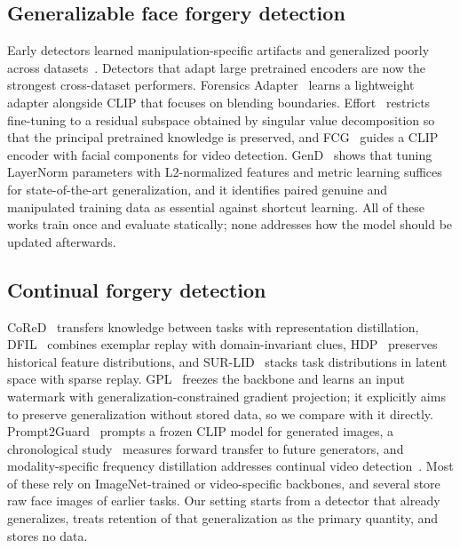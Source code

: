 \documentclass[journal]{IEEEtran}
\begin{document}
\subsection{Generalizable face forgery detection}
Early detectors learned manipulation-specific artifacts and generalized poorly across datasets~\cite{rossler2019faceforensics,yan2023deepfakebench}. Detectors that adapt large pretrained encoders are now the strongest cross-dataset performers. Forensics Adapter~\cite{cui2025forensicsadapter} learns a lightweight adapter alongside CLIP that focuses on blending boundaries. Effort~\cite{yan2025effort} restricts fine-tuning to a residual subspace obtained by singular value decomposition so that the principal pretrained knowledge is preserved, and FCG~\cite{han2025fcg} guides a CLIP encoder with facial components for video detection. GenD~\cite{yermakov2026gend} shows that tuning LayerNorm parameters with L2-normalized features and metric learning suffices for state-of-the-art generalization, and it identifies paired genuine and manipulated training data as essential against shortcut learning. All of these works train once and evaluate statically; none addresses how the model should be updated afterwards.

\subsection{Continual forgery detection}
CoReD~\cite{kim2021cored} transfers knowledge between tasks with representation distillation, DFIL~\cite{pan2023dfil} combines exemplar replay with domain-invariant clues, HDP~\cite{sun2023hdp} preserves historical feature distributions, and SUR-LID~\cite{cheng2025surlid} stacks task distributions in latent space with sparse replay. GPL~\cite{zhang2025gpl} freezes the backbone and learns an input watermark with generalization-constrained gradient projection; it explicitly aims to preserve generalization without stored data, so we compare with it directly. Prompt2Guard~\cite{laiti2024prompt2guard} prompts a frozen CLIP model for generated images, a chronological study~\cite{fontana2025chronological} measures forward transfer to future generators, and modality-specific frequency distillation addresses continual video detection~\cite{kim2026msfd}. Most of these rely on ImageNet-trained or video-specific backbones, and several store raw face images of earlier tasks. Our setting starts from a detector that already generalizes, treats retention of that generalization as the primary quantity, and stores no data.
\end{document}
